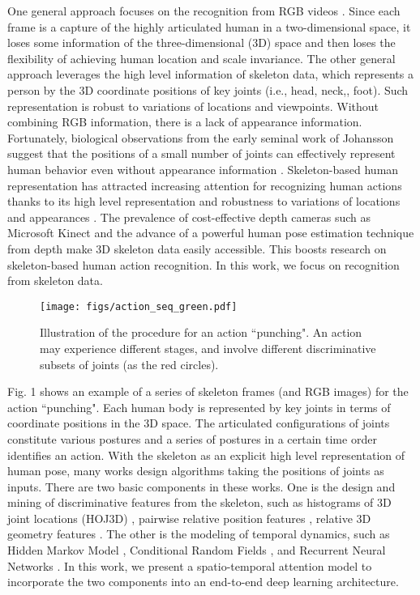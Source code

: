 \documentclass[letterpaper]{article}
\begin{document}
One general approach  focuses on the recognition from RGB videos \cite{CVIU11SurveyAction}. Since each frame is a capture of the highly articulated human in a two-dimensional space, it loses some information of the three-dimensional (3D) space and then loses the flexibility of achieving human location and scale invariance. The other general approach leverages the high level information of skeleton data, which represents a person by the 3D coordinate positions of key joints (i.e., head, neck,, foot). Such representation is robust to variations of locations and viewpoints. Without combining RGB information, there is a lack of appearance information. Fortunately, biological observations from the early seminal work of Johansson suggest that the positions of a small number of joints can effectively represent human behavior even without appearance information \cite{PP73Perception}. Skeleton-based human representation has attracted increasing attention for recognizing human actions thanks to its high level representation and robustness to variations of locations and appearances \cite{han2016space}. The prevalence of cost-effective depth cameras such as Microsoft Kinect \cite{zhang2012microsoft} and the advance of a powerful human pose estimation technique from depth \cite{Shotton2011} make 3D skeleton data easily accessible. This boosts  research on skeleton-based human action recognition. In this work, we focus on recognition from skeleton data.
\begin{figure}[t]
	\centering
	\texttt{[image: figs/action\_seq\_green.pdf]}
\vspace{-5mm}
	\caption{Illustration of the procedure for an action ``punching". An action may experience different stages, and involve different discriminative subsets of joints (as the red circles). }
\label{fig:skeleton}
\end{figure}


Fig. 1 shows an example of a series of skeleton frames (and RGB images) for the action ``punching". Each human body is represented by key joints in terms of coordinate positions in the 3D space. The articulated configurations of joints constitute various postures and a series of postures in a certain time order identifies an action. With the skeleton as an explicit high level representation of human pose, many works design algorithms taking the positions of joints as inputs. There are two basic components in these works. One is the design and mining of discriminative features from the skeleton, such as histograms of 3D joint locations (HOJ3D) \cite{CVPR12HO3DJ}, pairwise relative position features \cite{CVPR12Actionlet}, relative 3D geometry features \cite{vemulapalli2016r3dg}. The other is the modeling of temporal dynamics, such as Hidden Markov Model \cite{CVPR12HO3DJ}, Conditional Random Fields \cite{ICCV05CRF}, and Recurrent Neural Networks \cite{CVPR15HRNN}. In this work, we present a spatio-temporal attention model to incorporate the two components into an end-to-end deep learning architecture.
\end{document}
